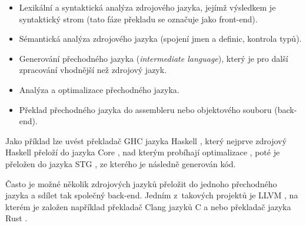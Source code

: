 \begin{itemize} 
  \item Lexikální a syntaktická analýza zdrojového jazyka, jejímž výsledkem je
    syntaktický strom (tato fáze překladu se označuje jako front-end).
  \item Sémantická analýza zdrojového jazyka (spojení jmen a definic, kontrola
    typů).
  \item Generování přechodného jazyka (\emph{intermediate language}), který je
    pro další zpracování vhodnější než zdrojový jazyk.
  \item Analýza a optimalizace přechodného jazyka.
  \item Překlad přechodného jazyka do assembleru nebo objektového souboru
    (back-end).
\end{itemize}

Jako příklad lze uvést překladač GHC jazyka Haskell
\cite{jones1993glasgow,haskellreport2010}, který nejprve zdrojový Haskell
přeloží do jazyka Core \cite{jones1996compiling}, nad kterým probíhají
optimalizace \cite{jones1997optimiser,santos1995compilation}, poté je přeložen
do jazyka STG \cite{jones1992implementing}, ze kterého je následně generován
kód.

Často je možné několik zdrojových jazyků přeložit do jednoho přechodného jazyka
a sdílet tak společný back-end. Jedním z~takových projektů je LLVM \cite{llvm},
na kterém je založen například překladač Clang \cite{clang} jazyků C a \Cplusplus
nebo překladač jazyka Rust \cite{rust}.
